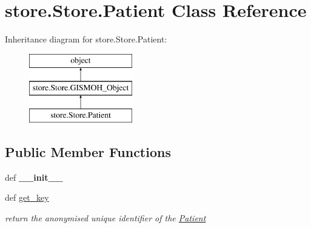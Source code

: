 \hypertarget{classstore_1_1_store_1_1_patient}{\section{store.\-Store.\-Patient Class Reference}
\label{classstore_1_1_store_1_1_patient}
}
Inheritance diagram for store.\-Store.\-Patient\-:\begin{figure}[H]
\begin{center}
\leavevmode
\includegraphics[height=3.000000cm]{classstore_1_1_store_1_1_patient}
\end{center}
\end{figure}
\subsection*{Public Member Functions}
\begin{DoxyCompactItemize}
\item 
\hypertarget{classstore_1_1_store_1_1_patient_ac8a2ecab27100f33c75fafa247298a97}{def {\bfseries \-\_\-\-\_\-init\-\_\-\-\_\-}}\label{classstore_1_1_store_1_1_patient_ac8a2ecab27100f33c75fafa247298a97}

\item 
\hypertarget{classstore_1_1_store_1_1_patient_a89d5fd5b6852bfd5efd4113ad12be491}{def \hyperlink{classstore_1_1_store_1_1_patient_a89d5fd5b6852bfd5efd4113ad12be491}{get\-\_\-key}}\label{classstore_1_1_store_1_1_patient_a89d5fd5b6852bfd5efd4113ad12be491}

\begin{DoxyCompactList}\small\item\em return the anonymised unique identifier of the \hyperlink{classstore_1_1_store_1_1_patient}{Patient} \end{DoxyCompactList}\end{DoxyCompactItemize}
